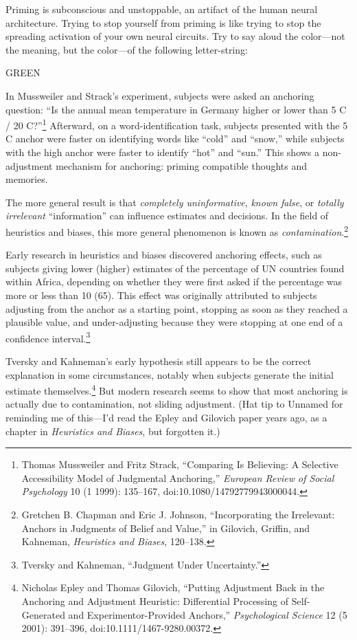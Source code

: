 {
 Priming is subconscious and unstoppable, an artifact of the human
neural architecture. Trying to stop yourself from priming is like
trying to stop the spreading activation of your own neural circuits.
Try to say aloud the color---not the meaning, but the color---of the
following letter-string:\newline
}

{\centering
 GREEN
\par}


\bigskip

{
 In Mussweiler and Strack's experiment, subjects
were asked an anchoring question: ``Is the annual mean
temperature in Germany higher or lower than 5 C / 20
C?''\footnote{Thomas Mussweiler and Fritz Strack,
``Comparing Is Believing: A Selective Accessibility
Model of Judgmental Anchoring,'' \textit{European
Review of Social Psychology} 10 (1 1999): 135--167,
doi:10.1080/14792779943000044.} Afterward, on a
word-identification task, subjects presented with the 5 C anchor were
faster on identifying words like
``cold'' and
``snow,'' while subjects with the
high anchor were faster to identify
``hot'' and
``sun.'' This shows a non-adjustment
mechanism for anchoring: priming compatible thoughts and memories.}

{
 The more general result is that \textit{completely uninformative},
\textit{known false}, or \textit{totally irrelevant}
``information'' can influence
estimates and decisions. In the field of heuristics and biases, this
more general phenomenon is known as
\textit{contamination}.\footnote{Gretchen B. Chapman and Eric J. Johnson,
``Incorporating the Irrelevant: Anchors in Judgments
of Belief and Value,'' in Gilovich, Griffin, and
Kahneman, \textit{Heuristics and Biases}, 120--138.}}

{
 Early research in heuristics and biases discovered anchoring
effects, such as subjects giving lower (higher) estimates of the
percentage of UN countries found within Africa, depending on whether
they were first asked if the percentage was more or less than 10 (65).
This effect was originally attributed to subjects adjusting from the
anchor as a starting point, stopping as soon as they reached a
plausible value, and under-adjusting because they were stopping at one
end of a confidence interval.\footnote{Tversky and Kahneman, ``Judgment Under
Uncertainty.''}}

{
 Tversky and Kahneman's early hypothesis still
appears to be the correct explanation in some circumstances, notably
when subjects generate the initial estimate
themselves.\footnote{Nicholas Epley and Thomas Gilovich, ``Putting
Adjustment Back in the Anchoring and Adjustment Heuristic: Differential
Processing of Self-Generated and Experimentor-Provided
Anchors,'' \textit{Psychological Science} 12 (5
2001): 391--396, doi:10.1111/1467-9280.00372.} But modern research seems to show that
most anchoring is actually due to contamination, not sliding
adjustment. (Hat tip to Unnamed for reminding me of
this---I'd read the Epley and Gilovich paper years ago,
as a chapter in \textit{Heuristics and Biases}, but forgotten it.)}

